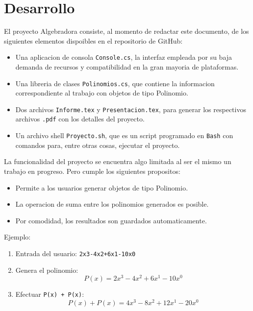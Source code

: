 \documentclass[a4paper,12pt]{article}
\begin{document}
\section{Desarrollo}
El proyecto Algebradora consiste, al momento de redactar este documento, de los siguientes elementos dispoibles en el repositorio de GitHub:
\begin{itemize}
    \item Una aplicacion de consola \verb|Console.cs|, la interfaz empleada por su baja demanda de recursos y compatibilidad en la gran mayoria de plataformas.
    \item Una libreria de clases \verb|Polinomios.cs|, que contiene la informacion correspondiente al trabajo con objetos de tipo Polinomio.
    \item Dos archivos \verb|Informe.tex| y \verb|Presentacion.tex|, para generar los respectivos archivos \verb|.pdf| con los detalles del proyecto.
    \item Un archivo shell \verb|Proyecto.sh|, que es un script programado en \verb|Bash| con comandos para, entre otras cosas, ejecutar el proyecto.
\end{itemize}

La funcionalidad del proyecto se encuentra algo limitada al ser el mismo un trabajo en progreso. Pero cumple los siguientes propositos:
\begin{itemize}
    \item Permite a los usuarios generar objetos de tipo Polinomio.
    \item La operacion de suma entre los polinomios generados es posible.
    \item Por comodidad, los resultados son guardados automaticamente.
\end{itemize}

Ejemplo:
\begin{center}
    \begin{enumerate}
        \item Entrada del usuario: \verb|2x3-4x2+6x1-10x0|
        \item Genera el polinomio:
              \begin{equation}
                  P(x) = 2x^3 - 4x^2 + 6x^1 - 10x^0
              \end{equation}
        \item Efectuar \verb|P(x) + P(x)|:
              \begin{equation}
                  P(x)+P(x) = 4x^3 - 8x^2 + 12x^1 - 20x^0
              \end{equation}
    \end{enumerate}
\end{center}
\end{document}
